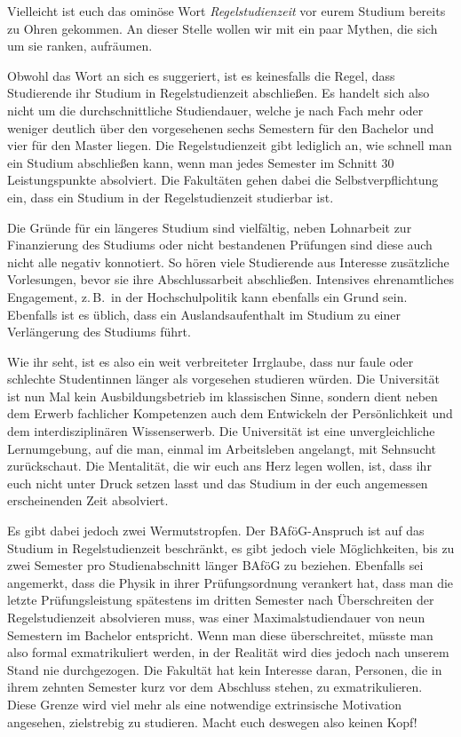 Vielleicht ist euch das ominöse Wort \emph{Regelstudienzeit} vor eurem Studium bereits zu Ohren gekommen. An dieser Stelle wollen wir mit ein paar Mythen, die sich um sie ranken, aufräumen.

Obwohl das Wort an sich es suggeriert, ist es keinesfalls die Regel, dass Studierende ihr Studium in Regelstudienzeit abschließen. Es handelt sich also nicht um die durchschnittliche Studiendauer, welche je nach Fach mehr oder weniger deutlich über den vorgesehenen sechs Semestern für den Bachelor und vier für den Master liegen. Die Regelstudienzeit gibt lediglich an, wie schnell man ein Studium abschließen kann, wenn man jedes Semester im Schnitt 30 Leistungspunkte absolviert. Die Fakultäten gehen dabei die Selbstverpflichtung ein, dass ein Studium in der Regelstudienzeit studierbar ist.

Die Gründe für ein längeres Studium sind vielfältig, neben Lohnarbeit zur Finanzierung des Studiums oder nicht bestandenen Prüfungen sind diese auch nicht alle negativ konnotiert. So hören viele Studierende aus Interesse zusätzliche Vorlesungen, bevor sie ihre Abschlussarbeit abschließen. Intensives ehrenamtliches Engagement, z.\,B.~in der Hochschulpolitik kann ebenfalls ein Grund sein. Ebenfalls ist es üblich, dass ein Auslandsaufenthalt im Studium zu einer Verlängerung des Studiums führt.

Wie ihr seht, ist es also ein weit verbreiteter Irrglaube, dass nur faule oder schlechte Studentinnen länger als vorgesehen studieren würden. Die Universität ist nun Mal kein Ausbildungsbetrieb im klassischen Sinne, sondern dient neben dem Erwerb fachlicher Kompetenzen auch dem Entwickeln der Persönlichkeit und dem interdisziplinären Wissenserwerb. Die Universität ist eine unvergleichliche Lernumgebung, auf die man, einmal im Arbeitsleben angelangt, mit Sehnsucht zurückschaut. Die Mentalität, die wir euch ans Herz legen wollen, ist, dass ihr euch nicht unter Druck setzen lasst und das Studium in der euch angemessen erscheinenden Zeit absolviert.

Es gibt dabei jedoch zwei Wermutstropfen. Der BAföG-Anspruch ist auf das Studium in Regelstudienzeit beschränkt, es gibt jedoch viele Möglichkeiten, bis zu zwei Semester pro Studienabschnitt länger BAföG zu beziehen. Ebenfalls sei angemerkt, dass die Physik in ihrer Prüfungsordnung verankert hat, dass man die letzte Prüfungsleistung spätestens im dritten Semester nach Überschreiten der Regelstudienzeit absolvieren muss, was einer Maximalstudiendauer von neun Semestern im Bachelor entspricht. Wenn man diese überschreitet, müsste man also formal exmatrikuliert werden, in der Realität wird dies jedoch nach unserem Stand nie durchgezogen. Die Fakultät hat kein Interesse daran, Personen, die in ihrem zehnten Semester kurz vor dem Abschluss stehen, zu exmatrikulieren. Diese Grenze wird viel mehr als eine notwendige extrinsische Motivation angesehen, zielstrebig zu studieren. Macht euch deswegen also keinen Kopf!

